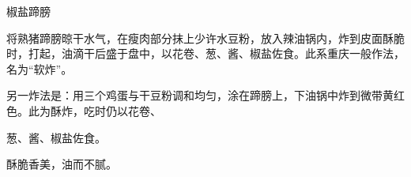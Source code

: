 \begin{recipe}{椒盐蹄膀}

\ingredients


\cooking

将熟猪蹄膀晾干水气，在瘦肉部分抹上少许水豆粉，放入辣油锅内，炸到皮面酥脆时，打起，油滴干后盛于盘中，以花卷、葱、酱、椒盐佐食。此系重庆一般作法，名为“软炸”。

另一炸法是：用三个鸡蛋与干豆粉调和均匀，涂在蹄膀上，下油锅中炸到微带黄红色。此为酥炸，吃时仍以花卷、

葱、酱、椒盐佐食。

\notes

酥脆香美，油而不腻。

\end{recipe}


